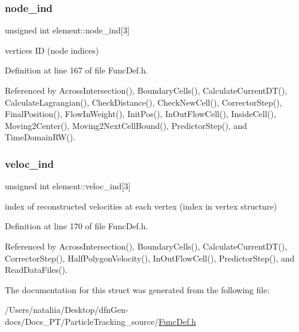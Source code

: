 \mbox{\label{structelement_aadc95dc4817009223151c40387f40e06}} 
\subsubsection{\texorpdfstring{node\_ind}{node\_ind}}
{\footnotesize\ttfamily unsigned int element\+::node\+\_\+ind\mbox{[}3\mbox{]}}

vertices ID (node indices) 

Definition at line 167 of file Func\+Def.\+h.



Referenced by Across\+Intersection(), Boundary\+Cells(), Calculate\+Current\+D\+T(), Calculate\+Lagrangian(), Check\+Distance(), Check\+New\+Cell(), Corrector\+Step(), Final\+Position(), Flow\+In\+Weight(), Init\+Pos(), In\+Out\+Flow\+Cell(), Inside\+Cell(), Moving2\+Center(), Moving2\+Next\+Cell\+Bound(), Predictor\+Step(), and Time\+Domain\+R\+W().

\mbox{\label{structelement_ab6062a713eca6e7458529ea45dea64d3}} 
\subsubsection{\texorpdfstring{veloc\_ind}{veloc\_ind}}
{\footnotesize\ttfamily unsigned int element\+::veloc\+\_\+ind\mbox{[}3\mbox{]}}

index of reconstructed velocities at each vertex (index in vertex structure) 

Definition at line 170 of file Func\+Def.\+h.



Referenced by Across\+Intersection(), Boundary\+Cells(), Calculate\+Current\+D\+T(), Corrector\+Step(), Half\+Polygon\+Velocity(), In\+Out\+Flow\+Cell(), Predictor\+Step(), and Read\+Data\+Files().



The documentation for this struct was generated from the following file\+:\begin{DoxyCompactItemize}
\item 
/\+Users/nataliia/\+Desktop/dfn\+Gen-\/docs/\+Docs\+\_\+\+P\+T/\+Particle\+Tracking\+\_\+source/\mbox{\hyperlink{_func_def_8h}{Func\+Def.\+h}}\end{DoxyCompactItemize}
